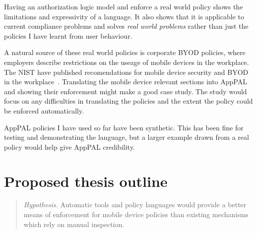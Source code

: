 \documentclass[a4paper]{scrartcl}
\begin{document}
Having an authorization logic model and enforce a real world policy shows the limitations and expressivity of a language.
It also shows that it is applicable to current compliance problems and solves \emph{real world problems} rather than just the policies I have learnt from user behaviour.

A natural source of these real world policies is corporate \ac{BYOD} policies, where employers describe restrictions on the useage of mobile devices in the workplace.
The \ac{NIST} have published recomendations for mobile device security and \ac{BYOD} in the workplace~\citep{Souppaya:2013jf,Scarfone:2009vy}.
Translating the mobile device relevant sections into AppPAL and showing their enforcement might make a good case study.
The study would focus on any difficulties in translating the policies and the extent the policy could be enforced automatically.

AppPAL policies I have used so far have been synthetic.
This has been fine for testing and demonstrating the language, but a larger example drawn from a real policy would help give AppPAL credibility.


\section{Proposed thesis outline}

\begin{quote}
  \emph{Hypothesis.} Automatic tools and policy languages would provide a
  better means of enforcement for mobile device policies than existing
  mechanisms which rely on manual inspection.
\end{quote}
\end{document}
